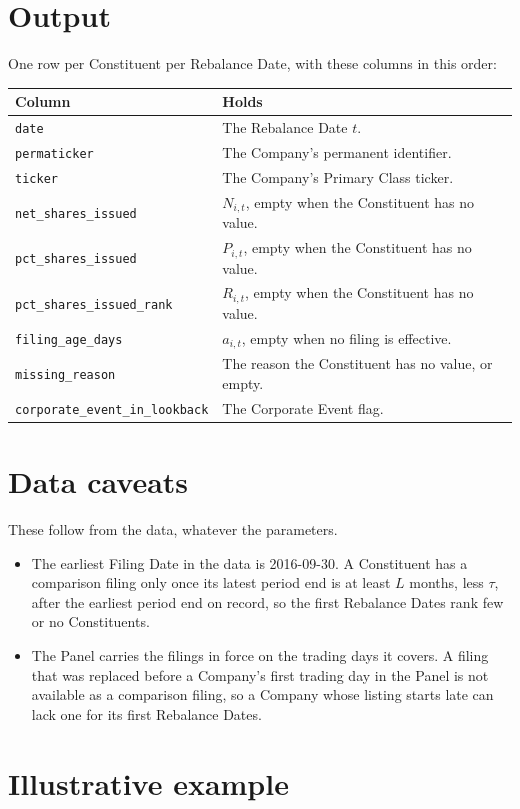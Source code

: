 \documentclass[11pt]{article}
\newcommand{\signalcolumn}[2]{\texttt{#1} & #2 \\}
\begin{document}
\section{Output}

One row per Constituent per Rebalance Date, with these columns in this order:

\begin{center}
\begin{tabularx}{\linewidth}{l X}
\toprule
Column & Holds \\
\midrule
\signalcolumn{date}{The Rebalance Date $t$.}
\signalcolumn{permaticker}{The Company's permanent identifier.}
\signalcolumn{ticker}{The Company's Primary Class ticker.}
\signalcolumn{net\_shares\_issued}{$N_{i,t}$, empty when the Constituent has no value.}
\signalcolumn{pct\_shares\_issued}{$P_{i,t}$, empty when the Constituent has no value.}
\signalcolumn{pct\_shares\_issued\_rank}{$R_{i,t}$, empty when the Constituent has no value.}
\signalcolumn{filing\_age\_days}{$a_{i,t}$, empty when no filing is effective.}
\signalcolumn{missing\_reason}{The reason the Constituent has no value, or empty.}
\signalcolumn{corporate\_event\_in\_lookback}{The Corporate Event flag.}
\bottomrule
\end{tabularx}
\end{center}

\section{Data caveats}

These follow from the data, whatever the parameters.

\begin{itemize}
  \item The earliest Filing Date in the data is 2016-09-30. A Constituent has a comparison
    filing only once its latest period end is at least $L$ months, less $\tau$, after the
    earliest period end on record, so the first Rebalance Dates rank few or no Constituents.
  \item The Panel carries the filings in force on the trading days it covers. A filing that was
    replaced before a Company's first trading day in the Panel is not available as a
    comparison filing, so a Company whose listing starts late can lack one for its first
    Rebalance Dates.
\end{itemize}

\clearpage
\appendix
\section{Illustrative example}
\label{app:example}
\end{document}
